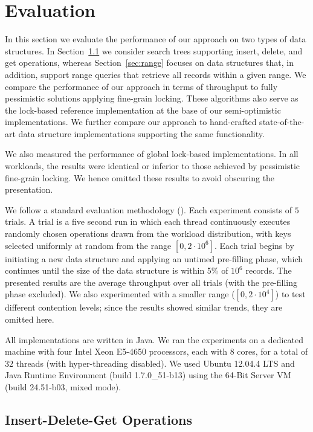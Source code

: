 \section{Evaluation}
\label{sec:eval}

In this section we evaluate the performance of our approach on two types of data
structures. In Section~\ref{sec:readwrite} we consider search trees
 supporting insert, delete, and get operations, whereas Section~\ref{sec:range}
 focuses on data structures that, in addition, support range queries that retrieve all
records within a given range. We compare the performance of our approach in terms of
throughput to fully pessimistic solutions applying fine-grain locking. These
algorithms also serve as the lock-based reference implementation at the base of
our semi-optimistic implementations.
We further
compare our approach to hand-crafted state-of-the-art data structure
implementations supporting the same functionality.

We also measured the performance of global lock-based implementations.
In all workloads, the results were identical or inferior to those
achieved by pessimistic fine-grain locking. We hence
omitted these results to avoid obscuring the presentation.

We follow a standard evaluation methodology
(\cite{DrachslerVY2014,NatarajanM2014,BrownER2014,ArbelA2014}). Each experiment
consists of $5$ trials. A trial is a five second run in which each thread continuously executes
randomly chosen operations drawn from the workload distribution, with keys
selected uniformly at random from the range $[0,2\cdot10^6]$.
Each trial begins by initiating a new data structure and applying an untimed pre-filling
phase, which continues until the size of the data structure is within 5\% of
$10^6$ records. The presented results are the average throughput over all trials
(with the pre-filling phase excluded).
We also experimented with a smaller range ($[0,2\cdot10^4]$) to test different
contention levels; since the results showed similar trends, they are omitted here.

All implementations are written in Java. We ran the experiments on a dedicated machine with
four Intel Xeon E5-4650 processors, each with $8$ cores, for a total of $32$ threads
(with hyper-threading disabled).
We used Ubuntu 12.04.4 LTS and Java Runtime Environment (build
1.7.0\_51-b13) using the 64-Bit Server VM (build 24.51-b03, mixed mode).

\subsection{Insert-Delete-Get Operations}
\label{sec:readwrite}

